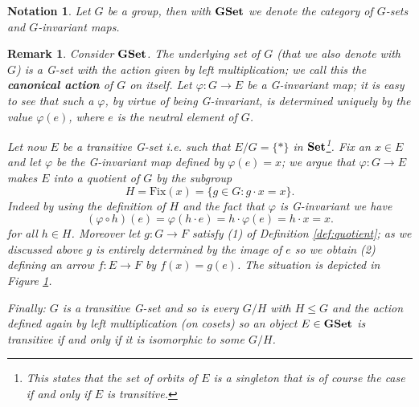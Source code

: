 \documentclass[italian, 12pt, reqno]{article}
\theoremstyle{myteo}
\newtheorem{remark}[theorem]{Remark}
\newtheorem{notation}[theorem]{Notation}
\numberwithin{equation}{section}
\newcommand{\gset}{\text{\textbf{GSet}}}
\newcommand{\set}{\text{\textbf{Set}}}
\newcommand{\fix}[1]{\text{Fix}(#1)}
\newcommand{\fun}[3]{#1\colon#2\to #3}
\begin{document}
\begin{notation}
  Let \(G\) be a group, then with \(\gset\) we denote the category of \(G\)-sets and \(G\)-invariant maps.
\end{notation}

\begin{remark}
  \label{rem:transitive_actions}
  Consider \(\gset\).
  The underlying set of \(G\) (that we also denote with \(G\)) is a G-set with the action given by left multiplication; we call this the \textbf{canonical action} of \(G\) on itself.
  Let \(\fun{\varphi}{G}{E}\) be a G-invariant map; it is easy to see that such a \(\varphi\), by virtue of being G-invariant, is determined uniquely by the value \(\varphi(e)\), where \(e\) is the neutral element of \(G\).

  Let now \(E\) be a transitive G-set i.e. such that \(E/G = \{*\}\) in \(\set\)\footnote{This states that the set of orbits of \(E\) is a singleton that is of course the case if and only if \(E\) is transitive.}.
  Fix an \(x\in E\) and let \(\varphi\) be the G-invariant map defined by \(\varphi(e) = x\); we argue that \(\fun{\varphi}{G}{E}\) makes \(E\) into a quotient of \(G\) by the subgroup
  \[H = \fix{x} = \{g\in G\colon g\cdot x = x\}.\]
  Indeed by using the definition of \(H\) and the fact that \(\varphi\) is G-invariant we have
  \[(\varphi\circ h)(e) = \varphi(h\cdot e) = h\cdot\varphi(e) = h\cdot x = x.\]
  for all \(h\in H\).
  Moreover let \(\fun{g}{G}{F}\) satisfy (1) of Definition \ref{def:quotient}; as we discussed above \(g\) is entirely determined by the image of \(e\) so we obtain (2) defining an arrow \(\fun{f}{E}{F}\) by \(f(x) = g(e)\).
  The situation is depicted in Figure \ref{diagram:transitive_actions}.

  Finally: \(G\) is a transitive G-set and so is every \(G/H\) with \(H\leq G\) and the action defined again by left multiplication (on cosets) so an object \(E\in\gset\) is transitive if and only if it is isomorphic to some \(G/H\).
\end{remark}

\begin{figure}
  \begin{center}
  \end{center}
  \caption{}
  \label{diagram:transitive_actions}
\end{figure}
\end{document}
